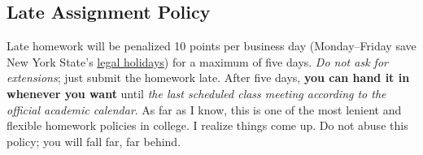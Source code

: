 \subsection*{Late Assignment Policy}

Late homework will be penalized 10 points per business day (Monday--Friday save New York State's \href{https://nysomce.org/page/legalholidays}{legal holidays}) for a maximum of five days. \textit{Do not ask for extensions}; just submit the homework late. After five days, \textbf{you can hand it in whenever you want} until \emph{the last scheduled class meeting according to the official academic calendar}. As far as I know, this is one of the most lenient and flexible homework policies in college. I realize things come up. Do not abuse this policy; you will fall far, far behind.